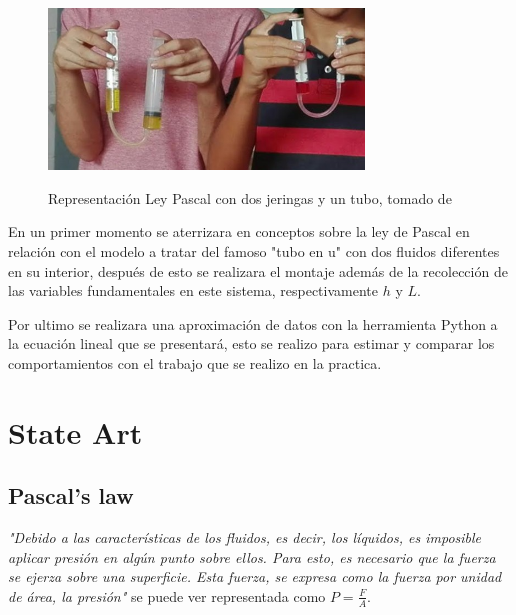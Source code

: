 \begin{figure}[h]
  \begin{center}
  \includegraphics[width=3.3in]{photo/introduccion-example.jpg}\\
  \caption{Representación Ley Pascal con dos jeringas y un tubo, tomado de \cite{pascal-jeringas}}\label{jeringa-example}
  \end{center}
\end{figure}
 
En un primer momento se aterrizara en conceptos sobre la ley de Pascal en relación con el modelo a tratar del famoso "tubo en u" con dos fluidos diferentes en su interior, después de esto se realizara el montaje además de la recolección de las variables fundamentales en este sistema, respectivamente $h$ y $L$.

Por ultimo se realizara una aproximación de datos con la herramienta Python a la ecuación lineal que se presentará, esto se realizo para estimar y comparar los comportamientos con el trabajo que se realizo en la practica.
\section{State Art}

\subsection{Pascal's law}
\textit{"Debido a las características de los fluidos, es decir, los líquidos, es imposible aplicar presión en algún punto sobre ellos. Para esto, es necesario que la fuerza se ejerza sobre una superficie. Esta fuerza, se expresa como la fuerza por unidad de área, la presión"} \cite{pascal-teory} se puede ver representada como $P = \frac{F}{A}$.

